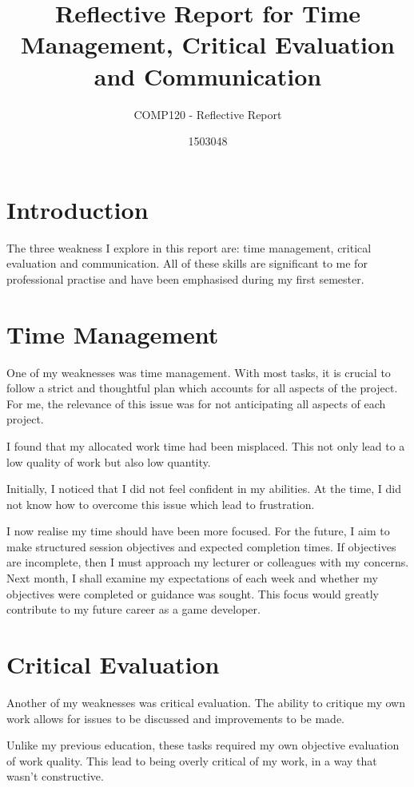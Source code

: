 \documentclass{scrartcl}
\title{Reflective Report for Time Management, Critical Evaluation and Communication}
\subtitle{COMP120 - Reflective Report}
\author{1503048}
\begin{document}
\maketitle

\section{Introduction}

The three weakness I explore in this report are: time management, critical evaluation and communication. All of these skills are significant to me for professional practise and have been emphasised during my first semester.

\section{Time Management}

One of my weaknesses was time management. With most tasks, it is crucial to follow a strict and thoughtful plan which accounts for all aspects of the project. For me, the relevance of this issue was for not anticipating all aspects of each project.

I found that my allocated work time had been misplaced. This not only lead to a low quality of work but also low quantity.

Initially, I noticed that I did not feel confident in my abilities. At the time, I did not know how to overcome this issue which lead to frustration.

I now realise my time should have been more focused. For the future, I aim to make structured session objectives and expected completion times. If objectives are incomplete, then I must approach my lecturer or colleagues with my concerns. Next month, I shall examine my expectations of each week and whether my objectives were completed or guidance was sought. This focus would greatly contribute to my future career as a game developer.

\section{Critical Evaluation}

Another of my weaknesses was critical evaluation. The ability to critique my own work allows for issues to be discussed and improvements to be made.

Unlike my previous education, these tasks required my own objective evaluation of work quality. This lead to being overly critical of my work, in a way that wasn't constructive.
\end{document}
